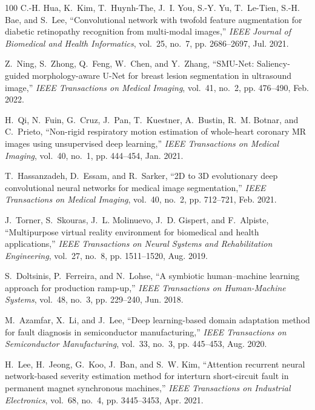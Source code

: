 \documentclass[journal]{IEEEtran}
\begin{document}
\begin{thebibliography}{100}
	C.-H. Hua, K.~Kim, T.~Huynh-The, J.~I. You, S.-Y. Yu, T.~Le-Tien, S.-H. Bae,
	and S.~Lee, ``Convolutional network with twofold feature augmentation for
	diabetic retinopathy recognition from multi-modal images,'' \emph{IEEE
		Journal of Biomedical and Health Informatics}, vol.~25, no.~7, pp.
	2686--2697, Jul. 2021.
	
	Z.~Ning, S.~Zhong, Q.~Feng, W.~Chen, and Y.~Zhang, ``{SMU-Net}: Saliency-guided
	morphology-aware {U-Net} for breast lesion segmentation in ultrasound
	image,'' \emph{IEEE Transactions on Medical Imaging}, vol.~41, no.~2, pp.
	476--490, Feb. 2022.
	
	H.~Qi, N.~Fuin, G.~Cruz, J.~Pan, T.~Kuestner, A.~Bustin, R.~M. Botnar, and
	C.~Prieto, ``Non-rigid respiratory motion estimation of whole-heart coronary
	{MR} images using unsupervised deep learning,'' \emph{IEEE Transactions on
		Medical Imaging}, vol.~40, no.~1, pp. 444--454, Jan. 2021.
	
	T.~Hassanzadeh, D.~Essam, and R.~Sarker, ``{2D} to {3D} evolutionary deep
	convolutional neural networks for medical image segmentation,'' \emph{IEEE
		Transactions on Medical Imaging}, vol.~40, no.~2, pp. 712--721, Feb. 2021.
	
	J.~Torner, S.~Skouras, J.~L. Molinuevo, J.~D. Gispert, and F.~Alpiste,
	``Multipurpose virtual reality environment for biomedical and health
	applications,'' \emph{IEEE Transactions on Neural Systems and Rehabilitation
		Engineering}, vol.~27, no.~8, pp. 1511--1520, Aug. 2019.
	
	S.~Doltsinis, P.~Ferreira, and N.~Lohse, ``A symbiotic human–machine learning
	approach for production ramp-up,'' \emph{IEEE Transactions on Human-Machine
		Systems}, vol.~48, no.~3, pp. 229--240, Jun. 2018.
	
	M.~Azamfar, X.~Li, and J.~Lee, ``Deep learning-based domain adaptation method
	for fault diagnosis in semiconductor manufacturing,'' \emph{IEEE Transactions
		on Semiconductor Manufacturing}, vol.~33, no.~3, pp. 445--453, Aug. 2020.
	
	H.~Lee, H.~Jeong, G.~Koo, J.~Ban, and S.~W. Kim, ``Attention recurrent neural
	network-based severity estimation method for interturn short-circuit fault in
	permanent magnet synchronous machines,'' \emph{IEEE Transactions on
		Industrial Electronics}, vol.~68, no.~4, pp. 3445--3453, Apr. 2021.
	

\end{thebibliography}
\end{document}
